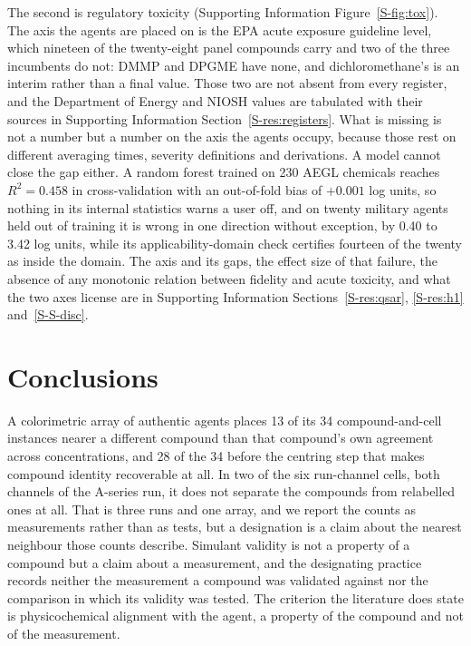 \documentclass[journal=jacsat,manuscript=article,margin=1in]{achemso}
\begin{document}

The second is regulatory toxicity (Supporting Information
Figure~\ref{S-fig:tox}). The axis the agents are placed on is the EPA acute
exposure guideline level, which nineteen of the twenty-eight panel compounds
carry and two of the three incumbents do not: DMMP and DPGME have none, and
dichloromethane's is an interim rather than a final value. Those two are not
absent from every register, and the Department of Energy and NIOSH values are
tabulated with their sources in Supporting Information
Section~\ref{S-res:registers}. What is missing is not a number but a number on
the axis the agents occupy, because those rest on different averaging times,
severity definitions and derivations. A
model cannot close the gap either. A random forest trained on 230 AEGL
chemicals reaches $R^{2}=0.458$ in cross-validation with an out-of-fold bias of
$+0.001$ log units, so nothing in its internal statistics warns a user off, and
on twenty military agents held out of training it is wrong in one
direction without exception, by 0.40 to 3.42 log units, while its
applicability-domain check certifies fourteen of the twenty as inside the
domain. The axis and its gaps, the effect size of that failure, the absence of
any monotonic relation between fidelity and acute toxicity, and what the two
axes license are in Supporting Information
Sections~\ref{S-res:qsar}, \ref{S-res:h1} and~\ref{S-S-disc}.

\section{Conclusions}

A colorimetric array of authentic agents places 13 of its 34
compound-and-cell instances nearer a different compound than that compound's
own agreement across concentrations, and 28 of the 34 before the centring step
that makes compound identity recoverable at all. In two of the six
run-channel cells, both channels of the A-series run, it does not separate the
compounds from relabelled ones at all. That is three runs and one array, and we
report the counts as measurements rather than as tests, but a designation is a
claim about the nearest neighbour those counts describe. Simulant
validity is not a property of a compound but a claim about a measurement, and
the designating practice records neither the measurement a compound was
validated against nor the comparison in which its validity was tested. The
criterion the literature does state is physicochemical alignment with the
agent,\cite{webb2025} a property of the compound and not of the
measurement.
\end{document}
